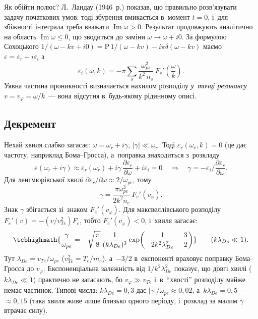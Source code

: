 Як обійти полюс? Л.~Ландау (1946~р.) показав, що правильно розв'язувати задачу початкових
умов: тоді збурення вмикається в~момент $t=0$, і~для збіжності інтеграла треба вважати
$\operatorname{Im}\omega>0$. Результат продовжують аналітично на область
$\operatorname{Im}\omega\le0$, що зводиться до заміни $\omega\to\omega+i0$. За формулою
Сохоцького
$1/(\omega-kv+i0)=\mathrm P\,1/(\omega-kv)-i\pi\delta(\omega-kv)$ маємо
$\varepsilon=\varepsilon_r+i\varepsilon_i$ з~
\begin{equation}\label{eq:eps-imag}
	\varepsilon_i(\omega,k)=-\pi\sum_s\frac{\omega_{ps}^2}{k^2\,n_s}\,F_s'\!\left(\frac{\omega}{k}\right).
\end{equation}
Уявна частина проникності визначається нахилом розподілу \emph{у~точці резонансу}
$v=v_\varphi=\omega/k$~--- вона відсутня в~будь-якому рідинному описі.

\subsection*{Декремент}
Нехай хвиля слабко загасає: $\omega=\omega_r+i\gamma$, $|\gamma|\ll\omega_r$. Тоді
$\varepsilon_r(\omega_r,k)=0$ (це дає частоту, наприклад Бома--Гросса), а~поправка
знаходиться з~розкладу
\[
\varepsilon(\omega_r+i\gamma)\approx\varepsilon_r(\omega_r)+i\gamma\,\frac{\partial\varepsilon_r}{\partial\omega}+i\varepsilon_i=0
\quad\Longrightarrow\quad
\gamma=-\varepsilon_i\Big/\frac{\partial\varepsilon_r}{\partial\omega}.
\]
Для ленгмюрівської хвилі $\partial\varepsilon_r/\partial\omega\approx2/\omega_{pe}$, тому
\begin{equation}\label{eq:landau-general}
	\gamma=\frac{\pi\omega_{pe}^3}{2k^2n_e}\,F_e'(v_\varphi).
\end{equation}
Знак $\gamma$ збігається зі~знаком $F_e'(v_\varphi)$. Для максвеллівського розподілу
$F_e'(v)=-(v/v_{Te}^2)F_e$, тобто $F_e'(v_\varphi)<0$, і~хвиля загасає:
\begin{equation}\label{eq:landau-gamma}
	\tcbhighmath{\frac{\gamma}{\omega_{pe}}=-\sqrt{\frac\pi8}\,\frac{1}{(k\lambda_{De})^3}
	\exp\!\left(-\frac{1}{2k^2\lambda_{De}^2}-\frac32\right)}\qquad(k\lambda_{De}\ll1).
\end{equation}
Тут $\lambda_{De}=v_{Te}/\omega_{pe}$ ($v_{Te}^2=T_e/m_e$), а~$-3/2$ в~експоненті
враховує поправку Бома--Гросса до $v_\varphi$. Експоненціальна залежність від
$1/k^2\lambda_{De}^2$ показує, що довгі хвилі ($k\lambda_{De}\ll1$) практично не
загасають, бо $v_\varphi\gg v_{Te}$ і~в~\enquote{хвості} розподілу майже немає частинок. Типові числа:
$k\lambda_{De}=0{,}3$ дає $|\gamma|/\omega_{pe}\approx0{,}02$, а~$k\lambda_{De}=0{,}5$~---
$\approx0{,}15$ (така хвиля живе лише близько одного періоду, і~розклад за малим $\gamma$ втрачає силу).

